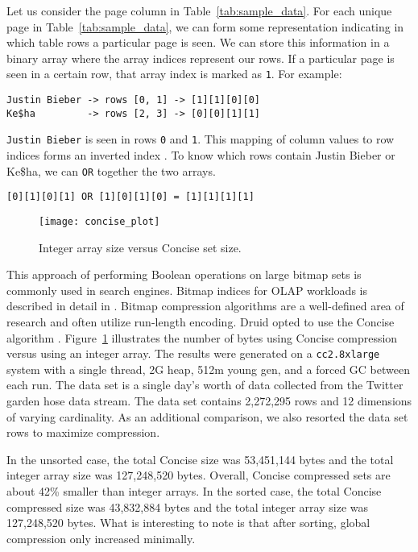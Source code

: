\documentclass{sig-alternate-2013}
\begin{document}
Let us consider the page column in
Table~\ref{tab:sample_data}. For each unique page in
Table~\ref{tab:sample_data}, we can form some representation
indicating in which table rows a particular page is seen. We can
store this information in a binary array where the array indices
represent our rows. If a particular page is seen in a certain
row, that array index is marked as \texttt{1}. For example:
{\small\begin{verbatim}
Justin Bieber -> rows [0, 1] -> [1][1][0][0]
Ke$ha         -> rows [2, 3] -> [0][0][1][1]
\end{verbatim}}

\texttt{Justin Bieber} is seen in rows \texttt{0} and \texttt{1}. This mapping of column values
to row indices forms an inverted index \cite{tomasic1993performance}. To know which
rows contain {\ttfamily Justin Bieber} or {\ttfamily Ke\$ha}, we can \texttt{OR} together
the two arrays.
{\small\begin{verbatim}
[0][1][0][1] OR [1][0][1][0] = [1][1][1][1]
\end{verbatim}}

\begin{figure}
\centering
\texttt{[image: concise\_plot]}
\caption{Integer array size versus Concise set size.}
\label{fig:concise_plot}
\end{figure}

This approach of performing Boolean operations on large bitmap sets is commonly
used in search engines. Bitmap indices for OLAP workloads is described in
detail in \cite{o1997improved}. Bitmap compression algorithms are a
well-defined area of research \cite{antoshenkov1995byte, wu2006optimizing,
van2011memory} and often utilize run-length encoding. Druid opted to use the
Concise algorithm \cite{colantonio2010concise}. Figure~\ref{fig:concise_plot}
illustrates the number of bytes using Concise compression versus using an
integer array. The results were generated on a \texttt{cc2.8xlarge} system with
a single thread, 2G heap, 512m young gen, and a forced GC between each run. The
data set is a single day’s worth of data collected from the Twitter garden hose
\cite{twitter2013} data stream. The data set contains 2,272,295 rows and 12
dimensions of varying cardinality. As an additional comparison, we also
resorted the data set rows to maximize compression.

In the unsorted case, the total Concise size was 53,451,144 bytes and the total
integer array size was 127,248,520 bytes. Overall, Concise compressed sets are
about 42\% smaller than integer arrays. In the sorted case, the total Concise
compressed size was 43,832,884 bytes and the total integer array size was
127,248,520 bytes. What is interesting to note is that after sorting, global
compression only increased minimally.
\end{document}
